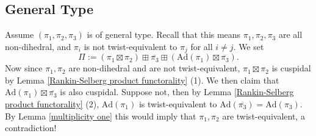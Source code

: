 \documentclass[12pt]{amsart}
\newcommand{\Ad}{\text{Ad}}
\newcommand{\ov}{\overline}
\begin{document}
\subsection{General Type}
Assume $(\pi_1,\pi_2,\pi_3)$ is of general type. Recall that this means $\pi_1,\pi_2,\pi_3$ are all non-dihedral, and $\pi_i$ is not twist-equivalent to $\pi_j$ for all $i \neq j$. We set
$$\Pi := (\pi_1 \boxtimes \pi_2) \boxplus \ov{\pi_3} \boxplus (\Ad(\pi_1) \boxtimes \ov{\pi_3}).$$
Now since $\pi_1,\pi_2$ are non-dihedral and are not twist-equivalent, $\pi_1 \boxtimes \pi_2$ is cuspidal by Lemma \ref{Rankin-Selberg product functorality} (1). We then claim that $\Ad(\pi_1) \boxtimes \ov{\pi_3}$ is also cuspidal. Suppose not, then by Lemma \ref{Rankin-Selberg product functorality} (2), $\Ad(\pi_1)$ is twist-equivalent to $\Ad(\ov{\pi_3}) = \Ad(\pi_3)$. By Lemma \ref{multiplicity one} this would imply that $\pi_1,\pi_2$ are twist-equivalent, a contradiction!
\end{document}
